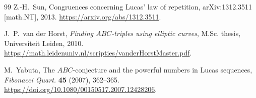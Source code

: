 \documentclass[11pt]{article}
\theoremstyle{remark}
\begin{document}
\begin{thebibliography}{99}
Z.-H.~Sun,
\newblock Congruences concerning Lucas' law of repetition,
\newblock arXiv:1312.3511 [math.NT], 2013.
\newblock \url{https://arxiv.org/abs/1312.3511}.

J.~P.~van der Horst,
\newblock \emph{Finding \(ABC\)-triples using elliptic curves},
\newblock M.Sc. thesis, Universiteit Leiden, 2010.
\newblock
\url{https://math.leidenuniv.nl/scripties/vanderHorstMaster.pdf}.

M.~Yabuta,
\newblock The \(ABC\)-conjecture and the powerful numbers in Lucas
sequences,
\newblock \emph{Fibonacci Quart.} \textbf{45} (2007), 362--365.
\newblock \url{https://doi.org/10.1080/00150517.2007.12428206}.

\end{thebibliography}
\end{document}
